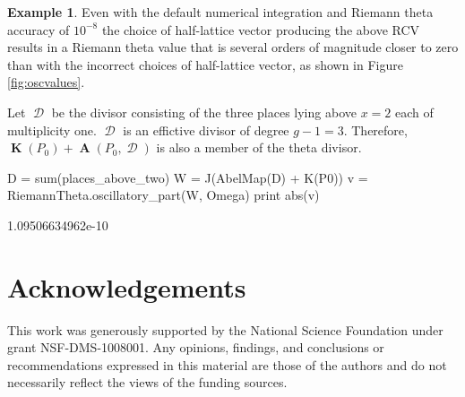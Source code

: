\documentclass[12pt]{article}
\theoremstyle{definition}
\newtheorem{example}[theorem]{Example}
\DeclareMathOperator{\DivD}{\mathcal{D}}
\DeclareMathOperator{\RCV}{\boldsymbol{K}}
\DeclareMathOperator{\Abel}{\boldsymbol{A}}
\begin{document}
\begin{example}
Even with the default numerical integration and Riemann theta accuracy
of $10^{-8}$ the choice of half-lattice vector producing the above RCV
results in a Riemann theta value that is several orders of magnitude
closer to zero than with the incorrect choices of half-lattice vector,
as shown in Figure \ref{fig:oscvalues}.

Let $\DivD$ be the divisor consisting of the three places lying above
$x=2$ each of multiplicity one. $\DivD$ is an effictive divisor of
degree $g-1 = 3$. Therefore, $\RCV(P_0) + \Abel(P_0,\DivD)$ is also a
member of the theta divisor.
\begin{ipythoninput}
D = sum(places_above_two)
W = J(AbelMap(D) + K(P0))
v = RiemannTheta.oscillatory_part(W, Omega)
print abs(v)
\end{ipythoninput}
\begin{ipythonoutput}
1.09506634962e-10
\end{ipythonoutput}
\end{example}


\section{Acknowledgements}


This work was generously supported by the National Science Foundation
under grant NSF-DMS-1008001. Any opinions, findings, and conclusions or
recommendations expressed in this material are those of the authors and
do not necessarily reflect the views of the funding sources.



\end{document}
